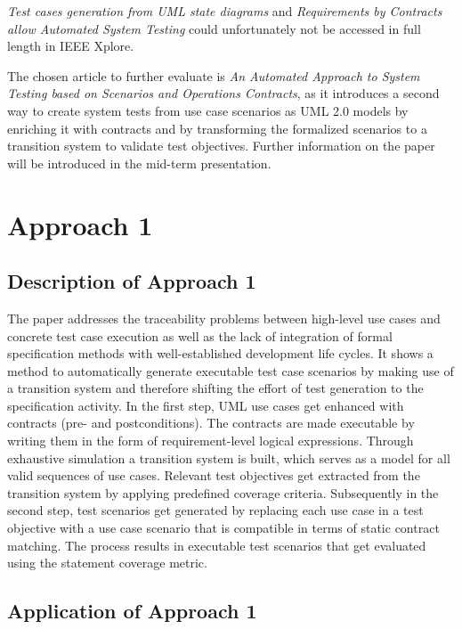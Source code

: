 \textit{Test cases generation from UML state diagrams} and \textit{Requirements by Contracts allow Automated System Testing} could unfortunately not be accessed in full length in IEEE Xplore.

The chosen article to further evaluate is \textit{An Automated Approach to System Testing based on Scenarios and Operations Contracts}, as it introduces a second way to create system tests from use case scenarios as UML 2.0 models by enriching it with contracts and by transforming the formalized scenarios to a transition system to validate test objectives. Further information on the paper will be introduced in the mid-term presentation.

\section{Approach 1} \label{approachone}

\subsection{Description of Approach 1}

The paper addresses the traceability problems between high-level use cases and concrete test case execution as well as the lack of integration of formal specification methods with well-established development life cycles. It shows a method to automatically generate executable test case scenarios by making use of a transition system and therefore shifting the effort of test generation to the specification activity. In the first step, UML use cases get enhanced with contracts (pre- and postconditions). The contracts are made executable by writing them in the form of requirement-level logical expressions. Through exhaustive simulation a transition system is built, which serves as a model for all valid sequences of use cases. Relevant test objectives get extracted from the transition system by applying predefined coverage criteria. Subsequently in the second step, test scenarios get generated by replacing each use case in a test objective with a use case scenario that is compatible in terms of static contract matching. The process results in executable test scenarios that get evaluated using the statement coverage metric.

\subsection{Application of Approach 1}

